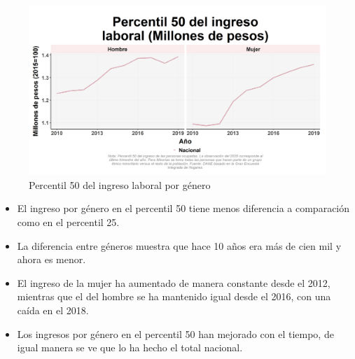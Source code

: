    \begin{figure}[H]
        \caption{Percentil 50 del ingreso laboral por género \label{map_result_2} }
        \begin{center}
        \includegraphics[width=\textwidth,keepaspectratio]{img/var_16_trend.png}
        \end{center}
    \end{figure}
            \begin{itemize}
                    \item El ingreso por género en el percentil 50 tiene menos diferencia a comparación como en el percentil 25.
                    \item La diferencia entre géneros muestra que hace 10 años era más de cien mil y ahora es menor.
                    \item El ingreso de la mujer ha aumentado de manera constante desde el 2012, mientras que el del hombre se ha mantenido igual desde el 2016, con una caída en el 2018.
                    \item Los ingresos por género en el percentil 50 han mejorado con el tiempo, de igual manera se ve que lo ha hecho el total nacional.
                \end{itemize}

